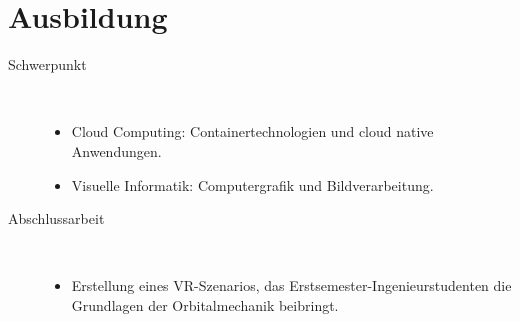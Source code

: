 \section{Ausbildung}
\begin{description}
    \item[Schwerpunkt]~
    \begin{itemize}[labelindent=\parindent, leftmargin=*]
        \item Cloud Computing: Containertechnologien und cloud native Anwendungen.
        \item Visuelle Informatik: Computergrafik und Bildverarbeitung.
    \end{itemize}
    \item[Abschlussarbeit]~
    \begin{itemize}[labelindent=\parindent, leftmargin=*]
        \item Erstellung eines VR-Szenarios, das Erstsemester-Ingenieurstudenten die Grundlagen der Orbitalmechanik beibringt.
    \end{itemize}
\end{description}
